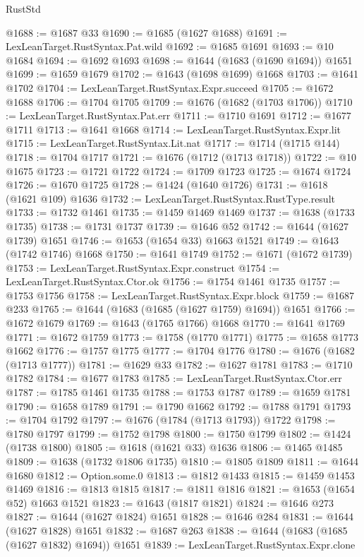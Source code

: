 \begin{lexlean}{RustStd}
\begin{coremodule}
@1688 := @1687 @33
@1690 := @1685 (@1627 @1688)
@1691 := LexLeanTarget.RustSyntax.Pat.wild
@1692 := @1685 @1691
@1693 := @10 @1684
@1694 := @1692 @1693
@1698 := @1644 (@1683 (@1690 @1694)) @1651
@1699 := @1659 @1679
@1702 := @1643 (@1698 @1699) @1668
@1703 := @1641 @1702
@1704 := LexLeanTarget.RustSyntax.Expr.succeed
@1705 := @1672 @1688
@1706 := @1704 @1705
@1709 := @1676 (@1682 (@1703 @1706))
@1710 := LexLeanTarget.RustSyntax.Pat.err
@1711 := @1710 @1691
@1712 := @1677 @1711
@1713 := @1641 @1668
@1714 := LexLeanTarget.RustSyntax.Expr.lit
@1715 := LexLeanTarget.RustSyntax.Lit.nat
@1717 := @1714 (@1715 @144)
@1718 := @1704 @1717
@1721 := @1676 (@1712 (@1713 @1718))
@1722 := @10 @1675
@1723 := @1721 @1722
@1724 := @1709 @1723
@1725 := @1674 @1724
@1726 := @1670 @1725
@1728 := @1424 (@1640 @1726)
@1731 := @1618 (@1621 @109) @1636
@1732 := LexLeanTarget.RustSyntax.RustType.result
@1733 := @1732 @1461
@1735 := @1459 @1469 @1469
@1737 := @1638 (@1733 @1735)
@1738 := @1731 @1737
@1739 := @1646 @52
@1742 := @1644 (@1627 @1739) @1651
@1746 := @1653 (@1654 @33) @1663 @1521
@1749 := @1643 (@1742 @1746) @1668
@1750 := @1641 @1749
@1752 := @1671 (@1672 @1739)
@1753 := LexLeanTarget.RustSyntax.Expr.construct
@1754 := LexLeanTarget.RustSyntax.Ctor.ok
@1756 := @1754 @1461 @1735
@1757 := @1753 @1756
@1758 := LexLeanTarget.RustSyntax.Expr.block
@1759 := @1687 @233
@1765 := @1644 (@1683 (@1685 (@1627 @1759) @1694)) @1651
@1766 := @1672 @1679
@1769 := @1643 (@1765 @1766) @1668
@1770 := @1641 @1769
@1771 := @1672 @1759
@1773 := @1758 (@1770 @1771)
@1775 := @1658 @1773 @1662
@1776 := @1757 @1775
@1777 := @1704 @1776
@1780 := @1676 (@1682 (@1713 @1777))
@1781 := @1629 @33
@1782 := @1627 @1781
@1783 := @1710 @1782
@1784 := @1677 @1783
@1785 := LexLeanTarget.RustSyntax.Ctor.err
@1787 := @1785 @1461 @1735
@1788 := @1753 @1787
@1789 := @1659 @1781
@1790 := @1658 @1789
@1791 := @1790 @1662
@1792 := @1788 @1791
@1793 := @1704 @1792
@1797 := @1676 (@1784 (@1713 @1793)) @1722
@1798 := @1780 @1797
@1799 := @1752 @1798
@1800 := @1750 @1799
@1802 := @1424 (@1738 @1800)
@1805 := @1618 (@1621 @33) @1636
@1806 := @1465 @1485
@1809 := @1638 (@1732 @1806 @1735)
@1810 := @1805 @1809
@1811 := @1644 @1680
@1812 := Option.some.{0}
@1813 := @1812 @1433
@1815 := @1459 @1453 @1469
@1816 := @1813 @1815
@1817 := @1811 @1816
@1821 := @1653 (@1654 @52) @1663 @1521
@1823 := @1643 (@1817 @1821)
@1824 := @1646 @273
@1827 := @1644 (@1627 @1824) @1651
@1828 := @1646 @284
@1831 := @1644 (@1627 @1828) @1651
@1832 := @1687 @263
@1838 := @1644 (@1683 (@1685 (@1627 @1832) @1694)) @1651
@1839 := LexLeanTarget.RustSyntax.Expr.clone

\end{coremodule}
\end{lexlean}
